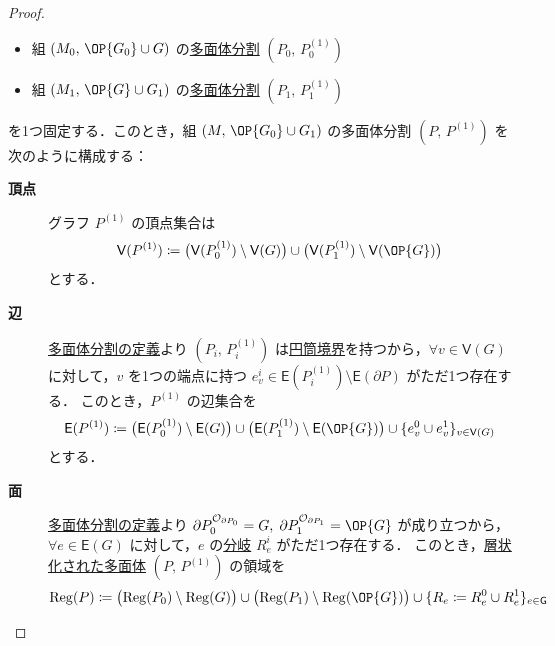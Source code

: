 \documentclass[TQFT_main]{subfiles}
\begin{document}
\begin{proof}

    \begin{itemize}
        \item 組 $(M_0,\, \OP{G_0} \cup G)$ の\hyperref[def:polytope-decomp]{多面体分割} $(P_0,\, P_0^{(1)})$
        \item 組 $(M_1,\, \OP{G} \cup G_1)$ の\hyperref[def:polytope-decomp]{多面体分割} $(P_1,\, P_1^{(1)})$
    \end{itemize}
    を1つ固定する．このとき，組 $(M,\, \OP{G_0} \cup G_1)$ の多面体分割 $(P,\, P^{(1)})$ を次のように構成する：
    \begin{description}
        \item[\textbf{頂点}] グラフ $P^{(1)}$ の頂点集合は
        \begin{align}
            \mathsf{V}(P^{(1)}) \coloneqq \bigl(\mathsf{V} (P_0^{(1)}) \setminus \mathsf{V} (G)\bigr) \cup \bigl(\mathsf{V} (P_1^{(1)}) \setminus \mathsf{V} (\OP{G})\bigr)
        \end{align}
        とする．
        \item[\textbf{辺}] 
        \hyperref[def:polyhedron]{多面体分割の定義}より $(P_i,\, P_i^{(1)})$ は\hyperref[def:graph-bdy]{円筒境界}を持つから，$\forall v \in \mathsf{V}(G)$ に対して，$v$ を1つの端点に持つ $e_v^i \in \mathsf{E} (P_i^{(1)}) \setminus \mathsf{E} (\partial P)$ がただ1つ存在する．
        このとき，$P^{(1)}$ の辺集合を
        \begin{align}
            \mathsf{E}(P^{(1)}) \coloneqq \bigl(\mathsf{E} (P_0^{(1)}) \setminus \mathsf{E} (G)\bigr) \cup \bigl(\mathsf{E} (P_1^{(1)}) \setminus \mathsf{E} (\OP{G})\bigr) \cup \{e_v^0 \cup e_v^1\}_{v \in \mathsf{V}(G)}
        \end{align}
        とする．
        \item[\textbf{面}]
        \hyperref[def:polyhedron]{多面体分割の定義}より $\partial P_0^{\mathcal{O}_{\partial P_0}} = G,\; \partial P_1^{\mathcal{O}_{\partial P_1}} = \OP{G}$ が成り立つから，$\forall e \in \mathsf{E} (G)$ に対して，$e$ の\hyperref[def:polyhedron]{分岐} $R_e^i$ がただ1つ存在する．
        このとき，\hyperref[def:polyhedron]{層状化された多面体} $(P,\, P^{(1)})$ の領域を
        \begin{align}
            \mathrm{Reg} (P) \coloneqq \bigl( \mathrm{Reg} (P_0) \setminus \mathrm{Reg} (G) \bigr) \cup \bigl( \mathrm{Reg} (P_1) \setminus \mathrm{Reg} (\OP{G}) \bigr) \cup \{R_e \coloneqq R_e^0 \cup R_e^1\}_{e \in \mathsf{G}}
        \end{align}

\end{description}
\end{proof}
\end{document}
